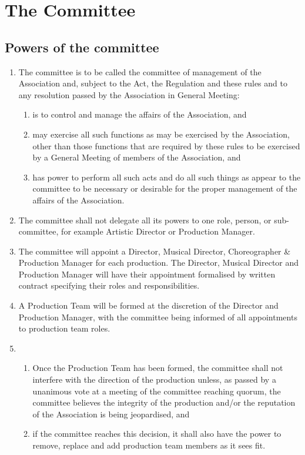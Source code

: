 \section{The Committee}
\subsection{Powers of the committee}
\begin{enumerate}
  \item The committee is to be called the committee of management of the Association and, subject to the Act, the Regulation and these rules and to any resolution passed by the Association in General Meeting:
    \begin{enumerate}
      \item is to control and manage the affairs of the Association, and
      \item may exercise all such functions as may be exercised by the Association, other than those functions that are required by these rules to be exercised by a General Meeting of members of the Association, and
      \item has power to perform all such acts and do all such things as appear to the committee to be necessary or desirable for the proper management of the affairs of the Association.
    \end{enumerate}
  \item The committee shall not delegate all its powers to one role, person, or sub-committee, for example Artistic Director or Production Manager.
  \item The committee will appoint a Director, Musical Director, Choreographer \& Production Manager for each production. The Director, Musical Director and Production Manager will have their appointment formalised by written contract specifying their roles and responsibilities.
  \item A Production Team will be formed at the discretion of the Director and Production Manager, with the committee being informed of all appointments to production team roles.
  \item
    \begin{enumerate}
      \item Once the Production Team has been formed, the committee shall not interfere with the direction of the production unless, as passed by a unanimous vote at a meeting of the committee reaching quorum, the committee believes the integrity of the production and/or the reputation of the Association is being jeopardised, and
      \item if the committee reaches this decision, it shall also have the power to remove, replace and add production team members as it sees fit.
    \end{enumerate}
\end{enumerate}
